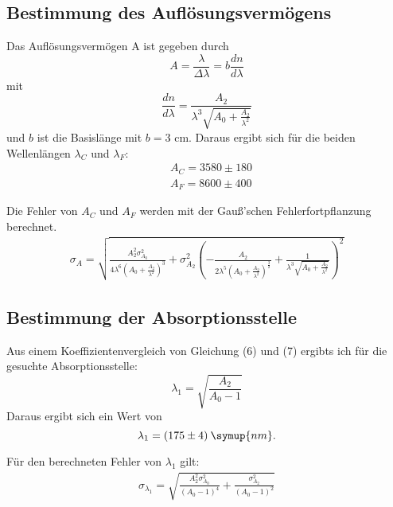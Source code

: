 \subsection{Bestimmung des Auflösungsvermögens}
Das Auflösungsvermögen A ist gegeben durch
\begin{equation*}
  A = \frac{\lambda}{\Delta \lambda} = b\frac{dn}{d\lambda}
\end{equation*}
mit
\begin{equation*}
  \frac{dn}{d\lambda} = \frac{A_2}{\lambda^3\sqrt{A_0 + \frac{A_2}{\lambda^2}}}
\end{equation*}
und $b$ ist die Basislänge mit $b = 3$ cm.
Daraus ergibt sich für die beiden Wellenlängen $\lambda_C$ und $\lambda_F$:
\begin{align*}
  &A_C = 3580 \pm 180 \\
  &A_F = 8600 \pm 400
\end{align*}


Die Fehler von $A_C$ und $A_F$ werden mit der Gauß'schen Fehlerfortpflanzung berechnet.
\begin{align*}
  \sigma_A = \sqrt{\frac{A_2^{2} \sigma_{A_0}^{2}}{4 \lambda^{6} \left(A_0 + \frac{A_2}{\lambda^{2}}\right)^{3}}
  + \sigma_{A_2}^{2} \left(- \frac{A_2}{2 \lambda^{5} \left(A_0 + \frac{A_2}{\lambda^{2}}\right)^{\frac{3}{2}}}
  + \frac{1}{\lambda^{3} \sqrt{A_0 + \frac{A_2}{\lambda^{2}}}}\right)^{2}}
\end{align*}

\subsection{Bestimmung der Absorptionsstelle}
Aus einem Koeffizientenvergleich von Gleichung (6) und (7) ergibts ich für die gesuchte Absorptionsstelle:
\begin{equation*}
  \lambda_1 = \sqrt{\frac{A_2}{A_0 - 1}}
\end{equation*}
Daraus ergibt sich ein Wert von
\begin{equation*}
  \lambda_1 = (175 \pm 4) \: \symup{nm} .
\end{equation*}

Für den berechneten Fehler von $\lambda_1$ gilt:
\begin{align*}
  \sigma_{\lambda_1} = \sqrt{\frac{A_2^{2} \sigma_{A_0}^{2}}{\left(A_0 - 1\right)^{4}} + \frac{\sigma_{A_2}^{2}}{\left(A_0 - 1\right)^{2}}}
\end{align*}
